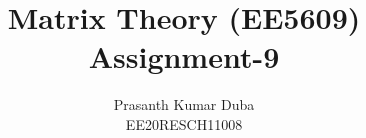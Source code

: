 \documentclass[journal,12pt,twocolumn]{IEEEtran}
\begin{document}
\makeatletter
{}
\makeatother
\let\StandardTheFigure\thefigure
\let\vec\mathbf
\renewcommand{\thefigure}{\theproblem}
\def\putbox#1#2#3{\makebox[0in][l]{\makebox[#1][l]{}\raisebox{\baselineskip}[0in][0in]{\raisebox{#2}[0in][0in]{#3}}}}
     \def\rightbox#1{\makebox[0in][r]{#1}}
     \def\centbox#1{\makebox[0in]{#1}}
     \def\topbox#1{\raisebox{-\baselineskip}[0in][0in]{#1}}
     \def\midbox#1{\raisebox{-0.5\baselineskip}[0in][0in]{#1}}
\vspace{3cm}
\title{Matrix Theory (EE5609) \\ Assignment-9}
\author{Prasanth Kumar Duba \\ EE20RESCH11008}
%
%
%
% 
%
\end{document}
